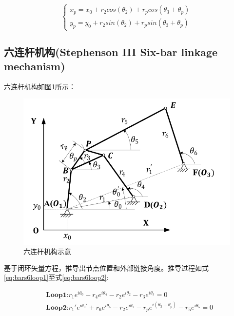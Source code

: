 \documentclass[]{ctexbook}
\begin{document}
\begin{equation}
\begin{cases} 
x_p=x_0+r_2cos(\theta_2)+r_pcos(\theta_3+\theta_p) \\ 
y_p=y_0+r_2sin(\theta_2)+r_psin(\theta_3+\theta_p)
\end{cases}
\label{eq:bars4loop4}
\end{equation}

\subsection{六连杆机构(Stephenson III Six-bar linkage
mechanism)}\label{bars6}

六连杆机构如图\ref{fig:sixbars}所示：

\begin{figure}

{\centering \includegraphics[width=0.7\linewidth]{img/bars6} 

}

\caption{六连杆机构示意}\label{fig:sixbars}
\end{figure}

基于闭环矢量方程，推导出节点位置和外部链接角度。推导过程如式\eqref{eq:bars6loop1}至式\eqref{eq:bars6loop2}:

\begin{equation}
\begin{split}
&\mathbf{\text{Loop1:}}   r_1e^{i\theta_0} + r_4e^{i\theta_4} - r_2e^{i\theta_2} -r_3e^{i\theta_3} = 0\\
&\mathbf{\text{Loop2:}}   r_1'e^{i\theta_0'} + r_6e^{i\theta_6} - r_2e^{i\theta_2} -r_pe^{i(\theta_3+\theta_p)}-r_5e^{i\theta_5} = 0\\
\end{split}
\label{eq:bars6loop1}
\end{equation}
\end{document}
